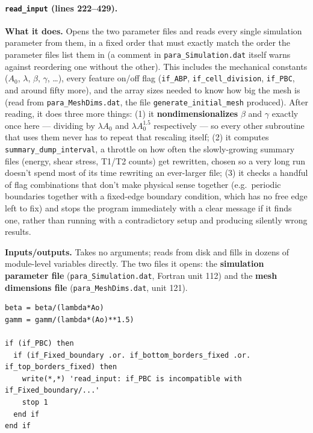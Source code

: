 \documentclass[11pt]{article}
\begin{document}
\paragraph{\texttt{read\_input} (lines 222--429).}
\textbf{What it does.} Opens the two parameter files and reads every single simulation
parameter from them, in a fixed order that must exactly match the order the parameter
files list them in (a comment in \texttt{para\_Simulation.dat} itself warns against
reordering one without the other). This includes the mechanical constants ($A_0$,
$\lambda$, $\beta$, $\gamma$, \dots), every feature on/off flag (\texttt{if\_ABP},
\texttt{if\_cell\_division}, \texttt{if\_PBC}, and around fifty more), and the array
sizes needed to know how big the mesh is (read from \texttt{para\_MeshDims.dat}, the
file \texttt{generate\_initial\_mesh} produced). After reading, it does three more
things: (1) it \textbf{nondimensionalizes} $\beta$ and $\gamma$ exactly once here ---
dividing by $\lambda A_0$ and $\lambda A_0^{1.5}$ respectively
--- so every other subroutine that uses them never has to repeat that rescaling itself;
(2) it computes \texttt{summary\_dump\_interval}, a throttle on how often the slowly-growing
summary files (energy, shear stress, T1/T2 counts) get rewritten, chosen so a very long
run doesn't spend most of its time rewriting an ever-larger file; (3) it checks a
handful of flag combinations that don't make physical sense together (e.g.\ periodic
boundaries together with a fixed-edge boundary condition, which has no free edge left
to fix) and stops the program immediately with a clear message if it finds one, rather
than running with a contradictory setup and producing silently wrong results.

\textbf{Inputs/outputs.} Takes no arguments; reads from disk and fills in dozens of
module-level variables directly. The two files it opens: the \textbf{simulation parameter
file} (\texttt{para\_Simulation.dat}, Fortran unit 112) and the \textbf{mesh dimensions
file} (\texttt{para\_MeshDims.dat}, unit 121).

\begin{lstlisting}[caption={A representative slice of \texttt{read\_input}: nondimensionalizing beta/gamma once, and one of several flag-compatibility checks.}]
beta = beta/(lambda*Ao)
gamm = gamm/(lambda*(Ao)**1.5)

if (if_PBC) then
  if (if_Fixed_boundary .or. if_bottom_borders_fixed .or. if_top_borders_fixed) then
    write(*,*) 'read_input: if_PBC is incompatible with if_Fixed_boundary/...'
    stop 1
  end if
end if
\end{lstlisting}
\end{document}
